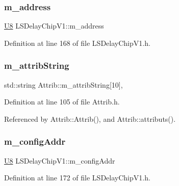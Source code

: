 \subsubsection{\texorpdfstring{m\+\_\+address}{m\_address}}
{\footnotesize\ttfamily \hyperlink{ICECALv3_8h_a3cb25ca6f51f003950f9625ff05536fc}{U8} L\+S\+Delay\+Chip\+V1\+::m\+\_\+address\hspace{0.3cm}{\ttfamily [private]}}



Definition at line 168 of file L\+S\+Delay\+Chip\+V1.\+h.

\mbox{\label{classAttrib_a3414521d7a82476e874b25a5407b5e63}} 
\subsubsection{\texorpdfstring{m\+\_\+attrib\+String}{m\_attribString}}
{\footnotesize\ttfamily std\+::string Attrib\+::m\+\_\+attrib\+String\mbox{[}10\mbox{]}\hspace{0.3cm}{\ttfamily [protected]}, {\ttfamily [inherited]}}



Definition at line 105 of file Attrib.\+h.



Referenced by Attrib\+::\+Attrib(), and Attrib\+::attributs().

\mbox{\label{classLSDelayChipV1_ab49ac38bf9e7a41ccb89c6725cfcac3a}} 
\subsubsection{\texorpdfstring{m\+\_\+config\+Addr}{m\_configAddr}}
{\footnotesize\ttfamily \hyperlink{ICECALv3_8h_a3cb25ca6f51f003950f9625ff05536fc}{U8} L\+S\+Delay\+Chip\+V1\+::m\+\_\+config\+Addr\hspace{0.3cm}{\ttfamily [private]}}



Definition at line 172 of file L\+S\+Delay\+Chip\+V1.\+h.



